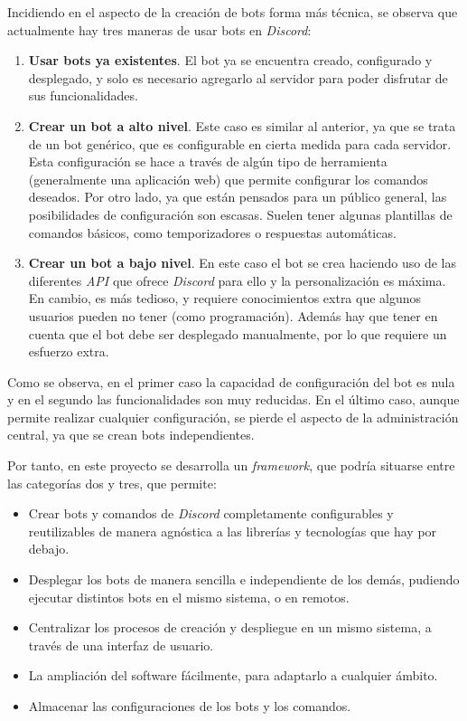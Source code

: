 Incidiendo en el aspecto de la creación de bots forma más técnica, se observa que actualmente hay tres maneras de usar bots en \textit{Discord}:

\begin{enumerate}
	\item \textbf{Usar bots ya existentes}. El bot ya se encuentra creado, configurado y desplegado, y solo es necesario agregarlo al servidor para poder disfrutar de sus funcionalidades.
	\item \textbf{Crear un bot a alto nivel}. Este caso es similar al anterior, ya que se trata de un bot genérico, que es configurable en cierta medida para cada servidor. Esta configuración se hace a través de algún tipo de herramienta (generalmente una aplicación web) que permite configurar los comandos deseados. Por otro lado, ya que están pensados para un público general, las posibilidades de configuración son escasas. Suelen tener algunas plantillas de comandos básicos, como temporizadores o respuestas automáticas.
	\item \textbf{Crear un bot a bajo nivel}. En este caso el bot se crea haciendo uso de las diferentes \textit{API} que ofrece \textit{Discord} para ello y la personalización es máxima. En cambio, es más tedioso, y requiere conocimientos extra que algunos usuarios pueden no tener (como programación). Además hay que tener en cuenta que el bot debe ser desplegado manualmente, por lo que requiere un esfuerzo extra.
\end{enumerate}

Como se observa, en el primer caso la capacidad de configuración del bot es nula y en el segundo las funcionalidades son muy reducidas. En el último caso, aunque permite realizar cualquier configuración, se pierde el aspecto de la administración central, ya que se crean bots independientes. 

Por tanto, en este proyecto se desarrolla un \textit{framework}, que podría situarse entre las categorías dos y tres, que permite:

\begin{itemize}
	\item Crear bots y comandos de \textit{Discord} completamente configurables y reutilizables de manera agnóstica a las librerías y tecnologías que hay por debajo.
	\item Desplegar los bots de manera sencilla e independiente de los demás, pudiendo ejecutar distintos bots en el mismo sistema, o en remotos.
	\item Centralizar los procesos de creación y despliegue en un mismo sistema, a través de una interfaz de usuario.
	\item La ampliación del software fácilmente, para adaptarlo a cualquier ámbito.
	\item Almacenar las configuraciones de los bots y los comandos.
\end{itemize}
